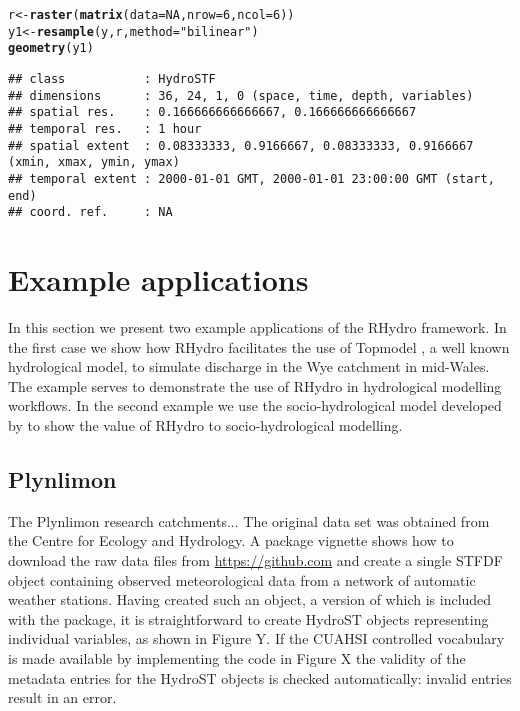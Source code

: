 \documentclass{icldt}\usepackage[]{graphicx}\usepackage[]{color}
\makeatletter
\newcommand{\hlnum}[1]{\textcolor[rgb]{0.686,0.059,0.569}{#1}}%
\newcommand{\hlstr}[1]{\textcolor[rgb]{0.192,0.494,0.8}{#1}}%
\newcommand{\hlstd}[1]{\textcolor[rgb]{0.345,0.345,0.345}{#1}}%
\newcommand{\hlkwb}[1]{\textcolor[rgb]{0.69,0.353,0.396}{#1}}%
\newcommand{\hlkwc}[1]{\textcolor[rgb]{0.333,0.667,0.333}{#1}}%
\newcommand{\hlkwd}[1]{\textcolor[rgb]{0.737,0.353,0.396}{\textbf{#1}}}%
\newenvironment{kframe}{%
 \def\at@end@of@kframe{}%
 \ifinner\ifhmode%
  \def\at@end@of@kframe{\end{minipage}}%
  \begin{minipage}{\columnwidth}%
 \fi\fi%
 \def\FrameCommand##1{\hskip\@totalleftmargin \hskip-\fboxsep
 \colorbox{shadecolor}{##1}\hskip-\fboxsep
     \hskip-\linewidth \hskip-\@totalleftmargin \hskip\columnwidth}%
 \MakeFramed {\advance\hsize-\width
   \@totalleftmargin\z@ \linewidth\hsize
   \@setminipage}}%
 {\par\unskip\endMakeFramed%
 \at@end@of@kframe}
\newenvironment{knitrout}{}{} %
\makeatother
\begin{document}
\begin{knitrout}
\color{fgcolor}\begin{kframe}
\begin{alltt}
\hlstd{r} \hlkwb{<-} \hlkwd{raster}\hlstd{(}\hlkwd{matrix}\hlstd{(}\hlkwc{data}\hlstd{=}\hlnum{NA}\hlstd{,} \hlkwc{nrow}\hlstd{=}\hlnum{6}\hlstd{,} \hlkwc{ncol}\hlstd{=}\hlnum{6}\hlstd{))}
\hlstd{y1} \hlkwb{<-} \hlkwd{resample}\hlstd{(y, r,} \hlkwc{method}\hlstd{=}\hlstr{"bilinear"}\hlstd{)}
\hlkwd{geometry}\hlstd{(y1)}
\end{alltt}
\begin{verbatim}
## class           : HydroSTF
## dimensions      : 36, 24, 1, 0 (space, time, depth, variables)
## spatial res.    : 0.166666666666667, 0.166666666666667
## temporal res.   : 1 hour
## spatial extent  : 0.08333333, 0.9166667, 0.08333333, 0.9166667 (xmin, xmax, ymin, ymax)
## temporal extent : 2000-01-01 GMT, 2000-01-01 23:00:00 GMT (start, end)
## coord. ref.     : NA
\end{verbatim}
\end{kframe}
\end{knitrout}


\section{Example applications}

In this section we present two example applications of the RHydro framework. In the first case we show how RHydro facilitates the use of Topmodel \citep{beven1979}, a well known hydrological model, to simulate discharge in the Wye catchment in mid-Wales. The example serves to demonstrate the use of RHydro in hydrological modelling workflows. In the second example we use the socio-hydrological model developed by \citep{garcia2016} to show the value of RHydro to socio-hydrological modelling.

\subsection{Plynlimon}
The Plynlimon research catchments... The original data set was obtained from the Centre for Ecology and Hydrology. A package vignette shows how to download the raw data files from \url{https://github.com} and create a single STFDF object containing observed meteorological data from a network of automatic weather stations. Having created such an object, a version of which is included with the package, it is straightforward to create HydroST objects representing individual variables, as shown in Figure Y. If the CUAHSI controlled vocabulary is made available by implementing the code in Figure X the validity of the metadata entries for the HydroST objects is checked automatically: invalid entries result in an error. \\
\end{document}
